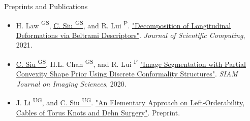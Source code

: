 \documentclass{resume} %
\begin{document}
\begin{rSection}{Preprints and Publications}
\begin{itemize}[noitemsep]
    \item H. Law {\textsuperscript{GS}}, \underline{C. Siu {\textsuperscript{GS}}}, and R. Lui \textsuperscript{P}. \href{https://doi.org/10.1007/s10915-021-01569-x}{"Decomposition of Longitudinal Deformations via Beltrami Descriptors"}. \emph{Journal of Scientific Computing}, 2021.
    
    \item \underline{C. Siu {\textsuperscript{GS}}}, H.L. Chan {\textsuperscript{GS}}, and R. Lui \textsuperscript{P} \href{https://doi.org/10.1137/19M129718X}{"Image Segmentation with Partial Convexity Shape Prior Using Discrete Conformality Structures"}. \emph{SIAM Journal on Imaging Sciences}, 2020.
    
    \item[$\diamond$] J. Li \textsuperscript{UG}, and \underline{C. Siu \textsuperscript{UG}}. \href{https://arxiv.org/abs/1610.00898}{"An Elementary Approach on Left-Orderability, Cables of Torus Knots and Dehn Surgery"}. Preprint.
\end{itemize}




\end{rSection}
\end{document}
